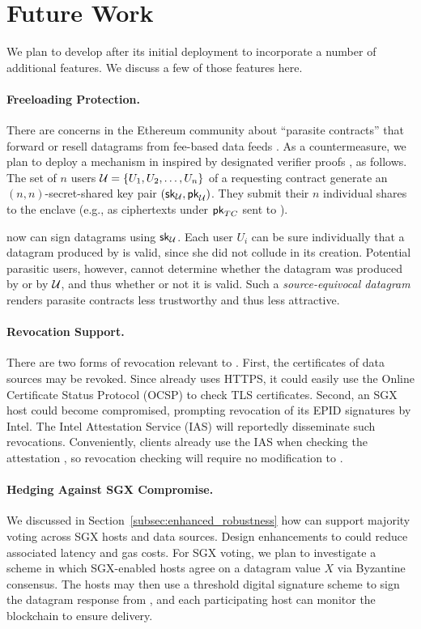 \section{Future Work}
\label{sec:future-work}

We plan to develop \tc after its initial deployment to incorporate a number of additional features.
We discuss a few of those features here.

\paragraph{Freeloading Protection.}
There are concerns in the Ethereum community about ``parasite contracts'' that forward or resell datagrams from fee-based data feeds \cite{parasite}.
As a countermeasure, we plan to deploy a mechanism in \tc inspired by designated verifier proofs \cite{JakobssonSI1996}, as follows.
The set of $n$ users ${\cal U} = \{U_1, U_2, \ldots, U_n\}$ of a requesting contract generate an $(n,n)$-secret-shared key pair $(\sk_{\cal U}, \pk_{\cal U})$. They submit their $n$ individual shares to the \tc enclave (e.g., as ciphertexts under ${\sf pk}_{TC}$ sent to \tcont). 

\tc now can sign datagrams using $\sk_{\cal U}$. Each user $U_i$ can be sure individually that a datagram produced by \tc is valid, since she did not collude in its creation. Potential parasitic users, however, cannot determine whether the datagram was produced by \tcont or by ${\cal U}$, and thus whether or not it is valid.
Such a \emph{source-equivocal datagram} renders parasite contracts less trustworthy and thus less attractive.

\paragraph{Revocation Support.}
There are two forms of revocation relevant to \tc.
First, the certificates of data sources may be revoked.
Since \tc already uses HTTPS, it could easily use the Online Certificate Status Protocol (OCSP) to check TLS certificates.
Second, an SGX host could become compromised, prompting revocation of its EPID signatures by Intel.
The Intel Attestation Service (IAS) will reportedly disseminate such revocations.
Conveniently, clients already use the IAS when checking the attestation \sigatt, so revocation checking will require no modification to \tc.

\paragraph{Hedging Against SGX Compromise.}
We discussed in Section~\ref{subsec:enhanced_robustness} how \tc can support majority voting across SGX hosts and data sources.
Design enhancements to \tc could reduce associated latency and gas costs.
For SGX voting, we plan to investigate a scheme in which SGX-enabled \tc hosts agree on a datagram value $X$ via Byzantine consensus.
The hosts may then use a threshold digital signature scheme to sign the datagram response from \tcadd,
and each participating host can monitor the blockchain to ensure delivery.

